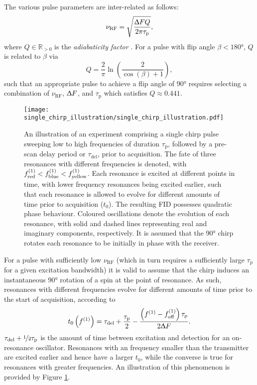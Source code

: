 The various pulse parameters are inter-related as follows:
\begin{equation}
    \nu_{\text{RF}} = \sqrt{
        \frac{\Updelta F Q}{2 \pi \tau_{\text{p}}}
    },
\end{equation}
where $Q \in \mathbb{R}_{>0}$ is the \emph{adiabaticity factor} . For a pulse with flip angle  $\beta < \ang{180}$,  $Q$ is
related to $\beta$ via
\begin{equation}
    Q = \frac{2}{\pi} \ln \left( \frac{2}{\cos(\beta) + 1} \right),
\end{equation}
such that an appropriate pulse to achieve a flip angle of \ang{90} requires
selecting a combination of $\nu_{\text{RF}}$, $\Updelta F$, and
$\tau_{\text{p}}$ which satisfies $Q \approx 0.441$.

\begin{figure}
    \centering
    \texttt{[image: single\_chirp\_illustration/single\_chirp\_illustration.pdf]}
    \caption{
        An illustration of an experiment comprising a single chirp pulse sweeping
        low to high frequencies of duration $\tau_{\text{p}}$, followed by
        a pre-scan delay period or $\tau_{\text{del}}$, prior to
        acquisition. The fate of three resonances with different frequencies is
        denoted, with $f^{(1)}_{\text{red}} < f^{(1)}_{\text{blue}} <
        f^{(1)}_{\text{yellow}}$. Each resonance is excited at different points
        in time, with lower frequency resonances being excited earlier, such that
        each resonance is allowed to evolve for different amounts of time prior
        to acquisition ($t_0$).
        The resulting \ac{FID} possesses quadratic phase behaviour.
        Coloured oscillations denote the evolution of each resonance, with
        solid and dashed lines representing real and imaginary components,
        respectively. It is assumed that the \ang{90} chirp rotates each
        resonance to be initially in phase with the receiver.
    }
    \label{fig:single-chirp}
\end{figure}

For a pulse with sufficiently low $\nu_{\text{RF}}$ (which in turn requires a
sufficiently large $\tau_{\text{p}}$ for a given excitation bandwidth) it is
valid to assume that the chirp induces an instantaneous \ang{90} rotation
of a spin at the point of resonance. As such, resonances with different
frequencies evolve for different amounts of time prior to the start of
acquisition, according to
\begin{equation}
    t_0\left( f^{(1)} \right) =
        \tau_{\text{del}} + \frac{\tau_{\text{p}}}{2} -
        \frac{\left( f^{(1)} - f_{\mathrm{off}}^{(1)} \right) \tau_{\text{p}}}{2 \Updelta F}.
    \label{eq:t0}
\end{equation}
$\tau_{\text{del}} + \nicefrac{1}{2} \tau_{\text{p}}$ is the amount of time
between excitation and detection for an on-resonance oscillator. Resonances
with an frequency smaller than the transmitter are excited earlier and hence
have a larger $t_0$, while the converse is true for resonances with greater
frequencies. An illustration of this phenomenon is provided by Figure
\ref{fig:single-chirp}.

